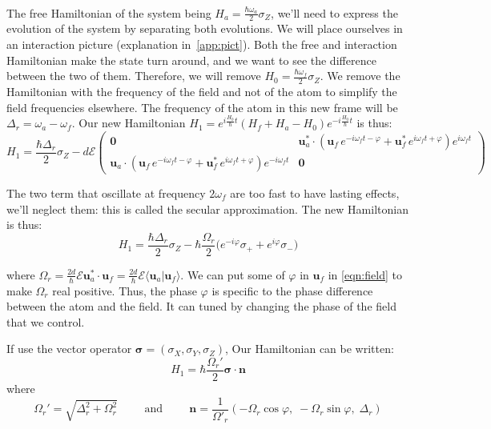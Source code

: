 \documentclass[10pt,a4paper]{report}
\theoremstyle{plain}
\theoremstyle{definition}
\theoremstyle{remark}
\newcommand{\braket}[2]{\langle#1|#2\rangle}
\newcommand{\mat}[1]{\begin{pmatrix}#1\end{pmatrix}}
\newcommand{\bs}{\boldsymbol}
\begin{document}
\

The free Hamiltonian of the system being $H_a = \frac{\hbar \omega_a}2 \sigma_Z$,
we'll need to express the evolution of the system by separating both evolutions.
We will place ourselves in an interaction picture (explanation
in~\cref{app:pict}). Both the free and interaction Hamiltonian make the state turn
around, and we want to see the difference between the two of them. Therefore, we
will remove $H_0 = \frac{\hbar \omega_f}2 \sigma_Z$. We remove the Hamiltonian
with the frequency of the field and not of the atom to simplify the field
frequencies elsewhere. The frequency of the atom in this new frame will be
$\Delta_r = \omega_a - \omega_f$.
Our new Hamiltonian $H_1 = e^{i\frac{H_0}\hbar t}(H_f + H_a - H_0)e^{-i\frac{H_0}\hbar t}$ is thus:
\[H_1 = \frac{\hbar \Delta_r}2 \sigma_Z -
  d\mathcal{E} \mat{\bs 0 &
    \bs u_a^* \cdot (\bs u_f\, e^{-i\omega_f t-\varphi} + \bs u_f^*\,
    e^{i\omega_f t + \varphi}) e^{i\omega_f t}\\
    \bs u_a \cdot (\bs u_f\, e^{-i\omega_f t-\varphi} + \bs u_f^*\,
    e^{i\omega_f t + \varphi}) e^{-i\omega_f t} & \bs 0
  }\]

The two term that oscillate at frequency $2\omega_f$ are too fast to have
lasting effects, we'll neglect them: this is called the secular approximation.
The new Hamiltonian is thus:
\begin{equation}\label{eqn:RamseyH}
H_1 = \frac{\hbar \Delta_r}2 \sigma_Z -\hbar \frac{\Omega_r}2
  \big(e^{-i\varphi}\sigma_+ + e^{i\varphi}\sigma_-\big)
\end{equation}

where $\Omega_r=\frac{2d}{\hbar}\mathcal{E}\bs u_a^* \cdot \bs u_f = \frac{2d}{\hbar}\mathcal{E}\braket{\bs u_a}{\bs u_f}$. We can put
some of $\varphi$ in $\bs u_f$ in \cref{eqn:field} to make $\Omega_r$ real
positive. Thus, the phase $\varphi$ is specific to the phase difference between the atom
and the field. It can tuned by changing the phase of the field that we control.

If use the vector operator $\bs \sigma = (\sigma_X,\sigma_Y,\sigma_Z)$, Our
Hamiltonian can be written:
\begin{equation}
H_1 = \hbar \frac{\Omega_r'}2 \bs \sigma \cdot \bs n
\end{equation}
where
\[ \Omega_r' = \sqrt{\Delta_r^2 + \Omega_r^2} \hspace {1cm}
  \text{and}\hspace{1cm} \bs n = \frac 1 {\Omega'_r}(-\Omega_r \cos \varphi,\;
  -\Omega_r \sin \varphi,\; \Delta_r)\]
\end{document}
